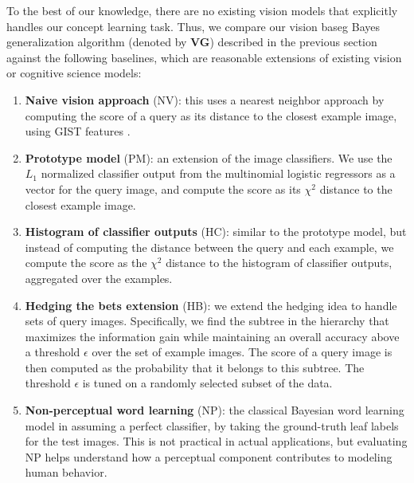 To the best of our knowledge, there are no existing vision models that explicitly handles our concept learning task. Thus, we compare our vision baseg Bayes generalization algorithm (denoted by {\bfseries VG}) described in the previous section against the following baselines, which are reasonable extensions of existing vision or cognitive science models:
\begin{enumerate}\setlength{\itemsep}{0pt}\setlength{\parskip}{0pt}
    \item {\bfseries Naive vision approach} (NV): this uses a nearest neighbor approach by computing the score of a query as its distance to the closest example image, using GIST features \cite{oliva2001modeling}.
    \item {\bfseries Prototype model} (PM): an extension of the image classifiers. We use the $L_1$ normalized classifier output from the multinomial logistic regressors as a vector for the query image, and compute the score as its $\chi^2$ distance to the closest example image.
    \item {\bfseries Histogram of classifier outputs} (HC): similar to the prototype model, but instead of computing the distance between the query and each example, we compute the score as the $\chi^2$ distance to the histogram of classifier outputs, aggregated over the examples.
    \item {\bfseries Hedging the bets extension} (HB): we extend the hedging idea \cite{deng2012hedging} to handle sets of query images. Specifically, we find the subtree in the hierarchy that maximizes the information gain while maintaining an overall accuracy above a threshold $\epsilon$ over the set of example images. The score of a query image is then computed as the probability that it belongs to this subtree. The threshold $\epsilon$ is tuned on a randomly selected subset of the data.
    \item {\bfseries Non-perceptual word learning} (NP): the classical Bayesian word learning model in \cite{xu2007word} assuming a perfect classifier, \ie by taking the ground-truth leaf labels for the test images. This is not practical in actual applications, but evaluating NP helps understand how a perceptual component contributes to modeling human behavior.
\end{enumerate}

